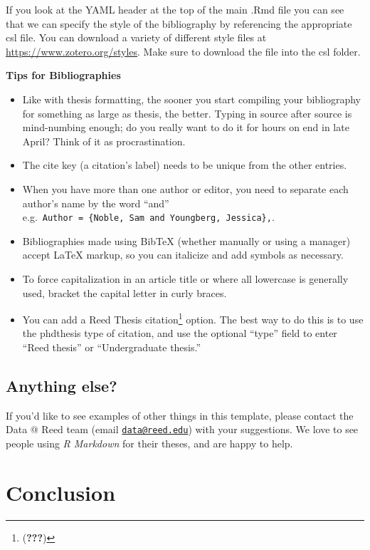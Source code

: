\documentclass[grad,numbers]{coppe}
\providecommand{\tightlist}{%
  \setlength{\itemsep}{0pt}\setlength{\parskip}{0pt}}
\begin{document}
  If you look at the YAML header at the top of the main .Rmd file you can see that we can specify the style of the bibliography by referencing the appropriate csl file. You can download a variety of different style files at \url{https://www.zotero.org/styles}. Make sure to download the file into the csl folder.
  
  \textbf{Tips for Bibliographies}
  \begin{itemize}
  \tightlist
  \item
    Like with thesis formatting, the sooner you start compiling your bibliography for something as large as thesis, the better. Typing in source after source is mind-numbing enough; do you really want to do it for hours on end in late April? Think of it as procrastination.
  \item
    The cite key (a citation's label) needs to be unique from the other entries.
  \item
    When you have more than one author or editor, you need to separate each author's name by the word ``and'' e.g.~\texttt{Author\ =\ \{Noble,\ Sam\ and\ Youngberg,\ Jessica\},}.
  \item
    Bibliographies made using BibTeX (whether manually or using a manager) accept LaTeX markup, so you can italicize and add symbols as necessary.
  \item
    To force capitalization in an article title or where all lowercase is generally used, bracket the capital letter in curly braces.
  \item
    You can add a Reed Thesis citation\footnote{({\textbf{???}})} option. The best way to do this is to use the phdthesis type of citation, and use the optional ``type'' field to enter ``Reed thesis'' or ``Undergraduate thesis.''
  \end{itemize}
  \hypertarget{anything-else}{%
  \section{Anything else?}\label{anything-else}}
  
  If you'd like to see examples of other things in this template, please contact the Data @ Reed team (email \href{mailto:data@reed.edu}{\nolinkurl{data@reed.edu}}) with your suggestions. We love to see people using \emph{R Markdown} for their theses, and are happy to help.
  
  \hypertarget{conclusion}{%
  \chapter*{Conclusion}\label{conclusion}}
  
\end{document}
